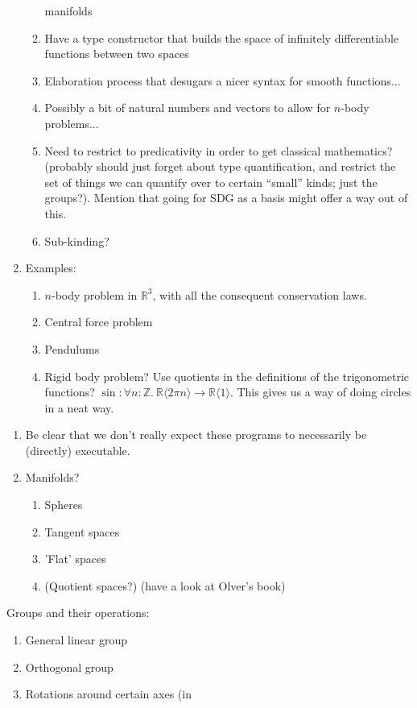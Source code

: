 \documentclass[preprint]{sigplanconf}
\theoremstyle{examplestyle}
\begin{document}
\begin{enumerate}
\begin{enumerate}
    manifolds
  \item Have a type constructor that builds the space of infinitely
    differentiable functions between two spaces
  \item Elaboration process that desugars a nicer syntax for smooth
    functions...
  \item Possibly a bit of natural numbers and vectors to allow for
    $n$-body problems...
  \item Need to restrict to predicativity in order to get classical
    mathematics? (probably should just forget about type
    quantification, and restrict the set of things we can quantify
    over to certain ``small'' kinds; just the groups?). Mention that
    going for SDG as a basis might offer a way out of this.
  \item Sub-kinding?
  \end{enumerate}
\item Examples:
  \begin{enumerate}
  \item $n$-body problem in $\mathbb{R}^3$, with all the consequent
    conservation laws.
  \item Central force problem
  \item Pendulums
  \item Rigid body problem? Use quotients in the definitions of the
    trigonometric functions? $\sin : \forall n :
    \mathbb{Z}.~\mathbb{R}\langle2\pi n\rangle \to \mathbb{R}\langle 1
    \rangle$. This gives us a way of doing circles in a neat way.
  \end{enumerate}
\end{enumerate}

\begin{enumerate}
\item Be clear that we don't really expect these programs to
  necessarily be (directly) executable.
\item Manifolds?
  \begin{enumerate}
  \item Spheres
  \item Tangent spaces
  \item 'Flat' spaces
  \item (Quotient spaces?) (have a look at Olver's book)
  \end{enumerate}
\end{enumerate}

Groups and their operations:
\begin{enumerate}
\item General linear group
\item Orthogonal group
\item Rotations around certain axes (in 
\end{enumerate}
\end{document}
